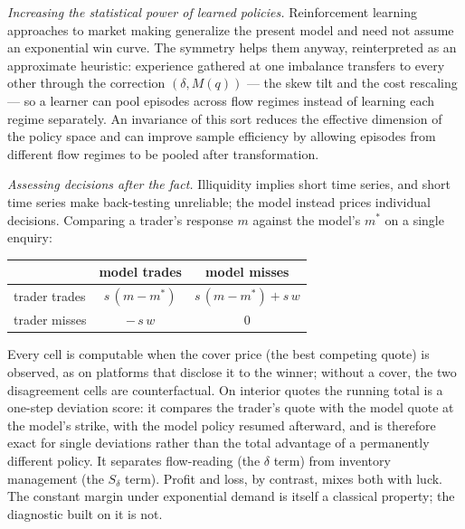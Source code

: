 \documentclass[11pt]{article}
\begin{document}
\emph{Increasing the statistical power of learned policies.} Reinforcement learning approaches to market making \cite{gueantmanziuk2019} generalize the present model and need not assume an exponential win curve. The symmetry helps them anyway, reinterpreted as an approximate heuristic: experience gathered at one imbalance transfers to every other through the correction $(\delta, M(q))$ --- the skew tilt and the cost rescaling --- so a learner can pool episodes across flow regimes instead of learning each regime separately. An invariance of this sort reduces the effective dimension of the policy space and can improve sample efficiency by allowing episodes from different flow regimes to be pooled after transformation.

\emph{Assessing decisions after the fact.} Illiquidity implies short time series, and short time series make back-testing unreliable; the model instead prices individual decisions. Comparing a trader's response $m$ against the model's $m^{*}$ on a single enquiry:

\begin{center}
\begin{tabular}{@{}lcc@{}}
\toprule
 & model trades & model misses \\
\midrule
trader trades & $s\,(m - m^{*})$ & $s\,(m - m^{*}) + s\,w$ \\
trader misses & $-\,s\,w$ & $0$ \\
\bottomrule
\end{tabular}
\end{center}

\noindent Every cell is computable when the cover price (the best competing quote) is observed, as on platforms that disclose it to the winner; without a cover, the two disagreement cells are counterfactual. On interior quotes the running total is a one-step deviation score: it compares the trader's quote with the model quote at the model's strike, with the model policy resumed afterward, and is therefore exact for single deviations rather than the total advantage of a permanently different policy. It separates flow-reading (the $\delta$ term) from inventory management (the $S_\delta$ term). Profit and loss, by contrast, mixes both with luck. The constant margin under exponential demand is itself a classical property; the diagnostic built on it is not.
\end{document}
